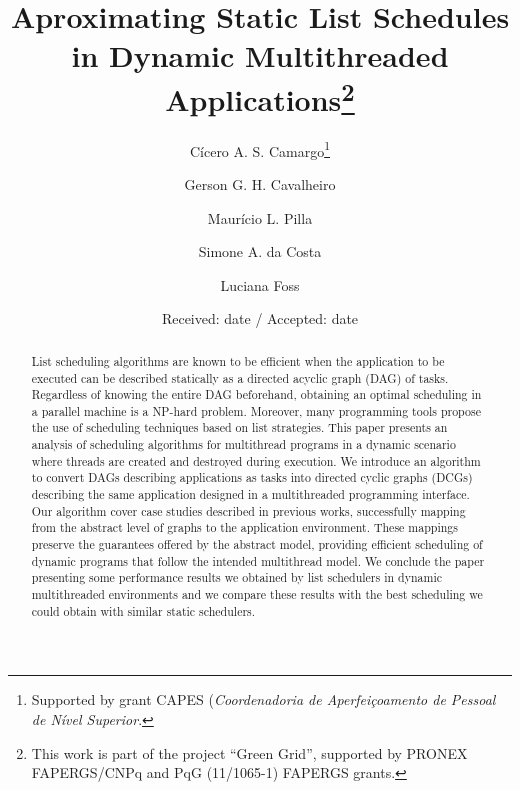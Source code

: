 \documentclass[twocolumn]{svjour3}
\begin{document}
\title{Aproximating Static List Schedules in Dynamic Multithreaded Applications\thanks{This work is part of the project ``Green Grid'', supported by PRONEX FAPERGS/CNPq and PqG (11/1065-1) FAPERGS grants.}}


\author{Cícero A. S. Camargo\thanks{Supported by grant CAPES (\emph{Coordenadoria de Aperfeiçoamento de Pessoal de Nível Superior}.}\and
        Gerson G. H. Cavalheiro
        \and Maurício L. Pilla
        \and Simone A. da Costa
        \and Luciana Foss
}



%
\date{Received: date / Accepted: date}


\maketitle

\begin{abstract}

List scheduling algorithms are known to be efficient when the application to be executed can be described statically as a directed acyclic graph (DAG) of tasks. Regardless of knowing the entire DAG beforehand, obtaining an optimal scheduling in a parallel machine is a NP-hard problem. Moreover, many programming tools propose the use of scheduling techniques based on list strategies. This paper presents an analysis of scheduling algorithms for multithread programs in a dynamic scenario where threads are created and destroyed during execution. We introduce an algorithm to convert DAGs describing applications as tasks into directed cyclic graphs (DCGs) describing the same application designed in a multithreaded programming interface. Our algorithm cover case studies described in previous works, successfully mapping from the abstract level of graphs to the application environment. These mappings preserve the guarantees offered by the abstract model, providing efficient scheduling of dynamic programs that follow the intended multithread model. We conclude the paper presenting some performance results we obtained by list schedulers in dynamic multithreaded environments and we compare these results with the best scheduling we could obtain with similar static schedulers.


\end{abstract}
\end{document}
